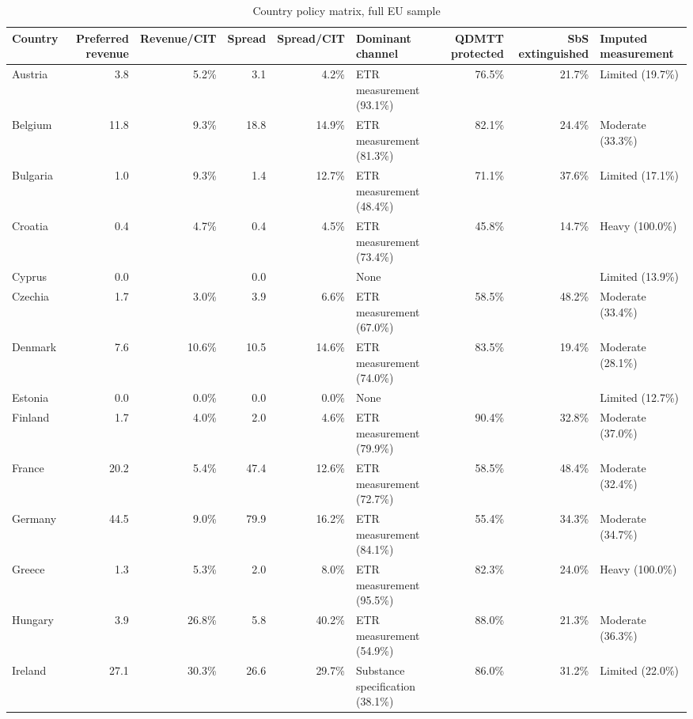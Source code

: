 \begin{table}[H]
\centering
\scriptsize
\caption{Country policy matrix, full EU sample}
\label{tab:app_country_policy_matrix}
\begin{adjustbox}{max width=\textwidth,center}
\begin{tabular}{@{}lrrrrlrrl@{}}
\toprule
Country & Preferred revenue & Revenue/CIT & Spread & Spread/CIT & Dominant channel & QDMTT protected & SbS extinguished & Imputed measurement \\
\midrule
Austria &  3.8 &   5.2\% &  3.1 &   4.2\% & ETR measurement (93.1\%) &  76.5\% & 21.7\% & Limited (19.7\%) \\
Belgium & 11.8 &   9.3\% & 18.8 &  14.9\% & ETR measurement (81.3\%) &  82.1\% & 24.4\% & Moderate (33.3\%) \\
Bulgaria &  1.0 &   9.3\% &  1.4 &  12.7\% & ETR measurement (48.4\%) &  71.1\% & 37.6\% & Limited (17.1\%) \\
Croatia &  0.4 &   4.7\% &  0.4 &   4.5\% & ETR measurement (73.4\%) &  45.8\% & 14.7\% & Heavy (100.0\%) \\
Cyprus &  0.0 &  &  0.0 &  & None &  &  & Limited (13.9\%) \\
Czechia &  1.7 &   3.0\% &  3.9 &   6.6\% & ETR measurement (67.0\%) &  58.5\% & 48.2\% & Moderate (33.4\%) \\
Denmark &  7.6 &  10.6\% & 10.5 &  14.6\% & ETR measurement (74.0\%) &  83.5\% & 19.4\% & Moderate (28.1\%) \\
Estonia &  0.0 &   0.0\% &  0.0 &   0.0\% & None &  &  & Limited (12.7\%) \\
Finland &  1.7 &   4.0\% &  2.0 &   4.6\% & ETR measurement (79.9\%) &  90.4\% & 32.8\% & Moderate (37.0\%) \\
France & 20.2 &   5.4\% & 47.4 &  12.6\% & ETR measurement (72.7\%) &  58.5\% & 48.4\% & Moderate (32.4\%) \\
Germany & 44.5 &   9.0\% & 79.9 &  16.2\% & ETR measurement (84.1\%) &  55.4\% & 34.3\% & Moderate (34.7\%) \\
Greece &  1.3 &   5.3\% &  2.0 &   8.0\% & ETR measurement (95.5\%) &  82.3\% & 24.0\% & Heavy (100.0\%) \\
Hungary &  3.9 &  26.8\% &  5.8 &  40.2\% & ETR measurement (54.9\%) &  88.0\% & 21.3\% & Moderate (36.3\%) \\
Ireland & 27.1 &  30.3\% & 26.6 &  29.7\% & Substance specification (38.1\%) &  86.0\% & 31.2\% & Limited (22.0\%) \\

\end{tabular}
\end{adjustbox}
\end{table}
